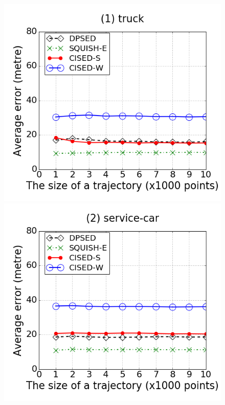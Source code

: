 \begin{figure}[tb!]
\centering
\includegraphics[scale = 0.240]{Figures/Exp-error-size-truck.png}
\includegraphics[scale = 0.240]{Figures/Exp-error-size-service.png}

\end{figure}
